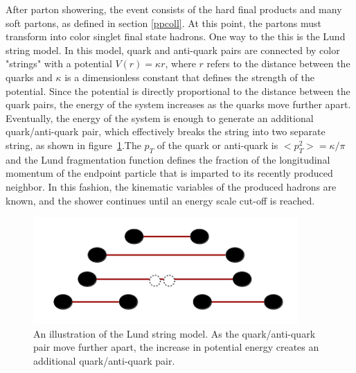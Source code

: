 \documentclass[oneside, letterpaper, oldfontcommands]{memoir}
\begin{document}
\qquad After parton showering, the event consists of the hard final products and many soft partons, as defined in section \ref{ppcoll}. At this point, the partons must transform into color singlet final state hadrons. One way to the this is the Lund string model\cite{Barger:020105876}. In this model, quark and anti-quark pairs are connected by color "strings" with a potential 
$V(r) = \kappa r $, where $r$ refers to the distance between the quarks and $\kappa$ is a dimensionless constant that defines the strength of the potential. Since the potential is directly proportional to the distance between the quark pairs, the energy of the system increases as the quarks move further apart. Eventually, the energy of the system is enough to generate an additional quark/anti-quark pair, which effectively breaks the string into two separate string, as shown in figure~\ref{fig:lund}.The $p_{T}$ of the quark or anti-quark is  
$<p^{2}_{T}> = \kappa / \pi$ and the Lund fragmentation function\cite{Agashe:2014kda} defines the fraction of the longitudinal momentum of the endpoint particle that is imparted to its recently produced neighbor. In this fashion, the kinematic variables of the produced hadrons are known, and the shower continues until an energy scale cut-off is reached.

\begin{figure}[here]
\includegraphics[width=0.9\textwidth]{lundstring.png}
\caption{An illustration of the Lund string model. As the quark/anti-quark pair move further apart, the increase in potential energy creates an additional quark/anti-quark pair.}
\label{fig:lund}
\end{figure}



\end{document}
